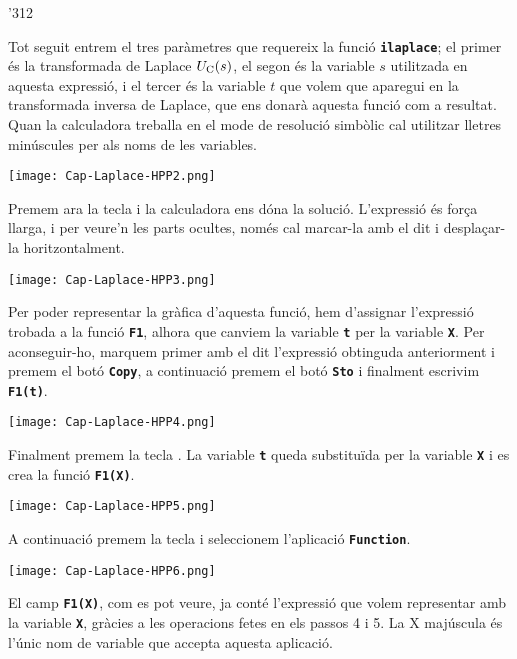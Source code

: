 \begin{exemple}
\begin{dingautolist}{'312}
         \item Tot seguit entrem el tres paràmetres que requereix la funció \texttt{\textbf{ilaplace}}; el primer és la transformada de Laplace  $U_\mathrm{C}(s)$, el segon és la variable $s$ utilitzada en aquesta expressió, i el tercer és la variable $t$ que volem que aparegui en la transformada inversa de Laplace, que ens donarà aquesta funció com a resultat. Quan la calculadora treballa en el  mode de resolució simbòlic cal utilitzar lletres minúscules per als noms de les variables.

            \texttt{[image: Cap-Laplace-HPP2.png]}

         \item Premem ara la tecla  i la calculadora ens dóna la solució. L'expressió és força llarga, i per veure'n les parts ocultes, només cal marcar-la amb el dit i desplaçar-la horitzontalment.

            \texttt{[image: Cap-Laplace-HPP3.png]}

         \item Per poder representar la gràfica d'aquesta funció, hem d'assignar l'expressió trobada a la  funció \texttt{\textbf{F1}}, alhora que canviem la variable \texttt{\textbf{t}} per la variable \texttt{\textbf{X}}. Per aconseguir-ho, marquem primer amb el dit l'expressió obtinguda anteriorment i premem el botó  \texttt{\textbf{Copy}}, a continuació premem el botó \texttt{\textbf{Sto\hspace{1mm}\faCaretRight}} i finalment escrivim  \texttt{\textbf{F1(t)}}.

            \texttt{[image: Cap-Laplace-HPP4.png]}

         \item Finalment premem la tecla . La variable \texttt{\textbf{t}} queda substituïda per la variable \texttt{\textbf{X}} i es crea la funció \texttt{\textbf{F1(X)}}.

          \texttt{[image: Cap-Laplace-HPP5.png]}


         \item A continuació premem  la tecla  i seleccionem  l'aplicació \texttt{\textbf{Function}}.

            \texttt{[image: Cap-Laplace-HPP6.png]}

          \item El camp  \texttt{\textbf{F1(X)}}, com es pot veure, ja conté l'expressió que volem representar amb la variable \texttt{\textbf{X}}, gràcies a les operacions fetes en els passos 4 i 5. La X majúscula és l'únic nom de variable que accepta aquesta aplicació.


\end{dingautolist}
\end{exemple}
